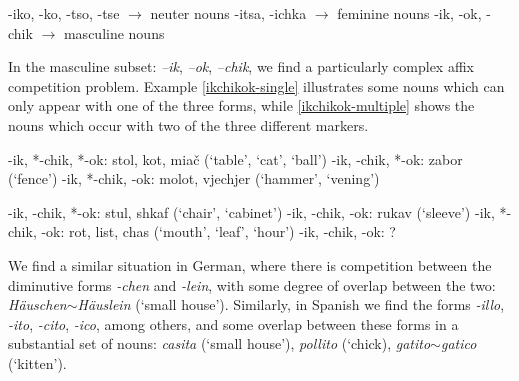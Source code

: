 \begin{exe}
    \ex \label{sys-dim}
    \begin{xlist}
        \ex -iko, -ko, -tso, -tse $\rightarrow$ neuter nouns
        \ex -itsa, -ichka $\rightarrow$ feminine nouns
        \ex -ik, -ok, -chik $\rightarrow$ masculine nouns
    \end{xlist}
\end{exe}

In the masculine subset: \textit{–ik}, \textit{–ok}, \textit{–chik}, we find a particularly complex affix competition problem. Example \ref{ikchikok-single} illustrates some nouns which can only appear with one of the three forms, while \ref{ikchikok-multiple} shows the nouns which occur with two of the three different markers.

\begin{exe}
    \ex \label{ikchikok-single}
    \begin{xlist}
        \ex -ik, *-chik, *-ok: stol, kot, miač (`table', `cat', `ball')
        \ex *-ik, -chik, *-ok: zabor (`fence')
        \ex *-ik, *-chik, -ok: molot, vjechjer (`hammer', `vening')
    \end{xlist}
\end{exe}

\begin{exe}
    \ex \label{ikchikok-multiple}
    \begin{xlist}
        \ex -ik, -chik, *-ok: stul, shkaf (`chair', `cabinet')
        \ex *-ik, -chik, -ok: rukav (`sleeve')
        \ex -ik, *-chik, -ok: rot, list, chas (`mouth', `leaf', `hour')
        \ex -ik, -chik, -ok: ?
    \end{xlist}
\end{exe}

We find a similar situation in German, where there is competition between the diminutive forms \textit{-chen} and \textit{-lein}, with some degree of overlap between the two: \textit{Häuschen}$\sim$\textit{Häuslein} (`small house'). Similarly, in Spanish we find the forms \textit{-illo}, \textit{-ito}, \textit{-cito}, \textit{-ico}, among others, and some overlap between these forms in a substantial set of nouns: \textit{casita} (`small house'), \textit{pollito} (`chick), \textit{gatito}$\sim$\textit{gatico} (`kitten').

